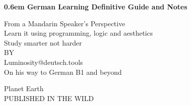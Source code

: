 \clearpage
\newcommand\nbvspace[1][3]{\vspace*{\stretch{#1}}}
\newcommand\nbstretchyspace{\spaceskip0.5em plus 0.25em minus 0.25em}
\newcommand{\nbtitlestretch}{\spaceskip0.6em}
\pagestyle{empty}
\begin{center}
\bfseries
\nbvspace[1]
\Huge
{\nbtitlestretch\huge
German Learning Definitive Guide and Notes}

\nbvspace[1]
\normalsize

From a Mandarin Speaker's Perspective\\
Learn it using programming, logic and aesthetics\\
Study smarter not harder \\
\nbvspace[1]
\small BY\\
\Large Luminosity@deutsch.tools\\[0.5em]
\footnotesize On his way to German B1 and beyond \\

\nbvspace[2]


\nbvspace[3]
\normalsize

Planet Earth\\
\large
PUBLISHED IN THE WILD
\nbvspace[1]
\end{center}